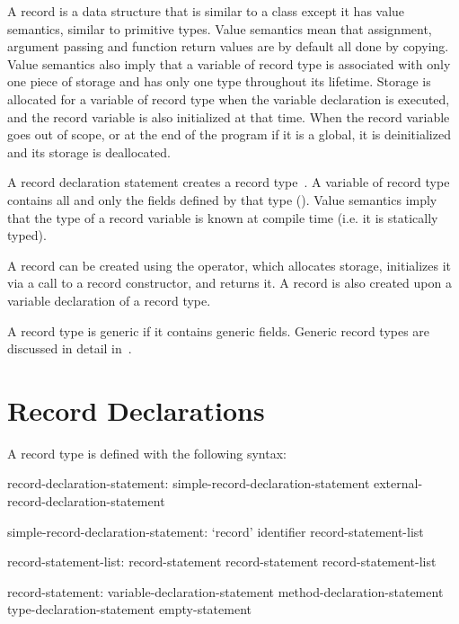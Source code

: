 \label{Records}

A record is a data structure that is similar to a class except it has
value semantics, similar to primitive types.  Value semantics mean that
assignment, argument passing and function return values are by default
all done by copying.  Value semantics also imply that a variable of
record type is associated with only one piece of storage and has only one
type throughout its lifetime.  Storage is allocated for a variable of
record type when the variable declaration is executed, and the record
variable is also initialized at that time. When the record variable goes
out of scope, or at the end of the program if it is a global, it is
deinitialized and its storage is deallocated.

A record declaration statement creates a record
type~.  A variable of record type contains all
and only the fields defined by that type ().  Value
semantics imply that the type of a record variable is known at compile
time (i.e. it is statically typed).

A record can be created using the  operator, which allocates
storage, initializes it via a call to a record constructor, and returns
it.  A record is also created upon a variable declaration of a record
type.

A record type is generic if it contains generic fields.  Generic record types
are discussed in detail in~.

\section{Record Declarations}
\label{Record_Declarations}

A record type is defined with the following syntax:
\begin{syntax}
record-declaration-statement:
  simple-record-declaration-statement
  external-record-declaration-statement

simple-record-declaration-statement:
  `record' identifier { record-statement-list }

record-statement-list:
  record-statement
  record-statement record-statement-list

record-statement:
  variable-declaration-statement
  method-declaration-statement
  type-declaration-statement
  empty-statement
\end{syntax}

